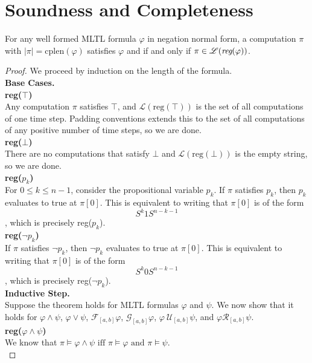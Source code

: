 \documentclass[runningheads]{llncs}
\renewcommand{\phi}{\varphi}
\begin{document}
 \section{Soundness and Completeness} \label{Appendix-SoundComplete}
\renewcommand\thetheorem{2}
 \begin{theorem}
 For any well formed MLTL formula $\phi$ in negation normal form, a computation $\pi$ with $|\pi| = \text{cplen}(\phi)$ satisfies $\phi$ and  if and only if $\pi \in \mathscr{L}(\emph{reg}(\phi))$.
\end{theorem}
 \begin{proof}
 We proceed by induction on the length of the formula.\\
 \noindent \textbf{Base Cases.}\\
 \noindent\textbf{reg($\top$)}\\
 Any computation $\pi$ satisfies $\top$, and $\mathscr{L}(\text{reg}(\top))$ is the set of all computations of one time step. Padding conventions extends this to the set of all computations of any positive number of time steps, so we are done.\\
 \noindent\textbf{reg($\bot$)}\\
 There are no computations that satisfy $\bot$ and $\mathscr{L}(\text{reg}(\bot))$ is the empty string, so we are done.\\
 \noindent\textbf{reg($p_k$)}\\
 For $0\leq k \leq n-1$, consider the propositional variable $p_k$. If $\pi$ satisfies $p_k$, then $p_k$ evaluates to true at $\pi[0]$. This is equivalent to writing that $\pi[0]$ is of the form 
 $$S^{k} 1 S^{n-k-1}$$,
 which is precisely reg($p_k$).\\
 \noindent\textbf{reg($\neg p_k$)}\\
 If $\pi$ satisfies $\neg p_k$, then $\neg p_k$ evaluates to true at $\pi[0]$. This is equivalent to writing that $\pi[0]$ is of the form 
 $$S^{k} 0 S^{n-k-1}$$,
 which is precisely reg($\neg p_k$).\\
 \noindent\textbf{Inductive Step.}\\
 Suppose the theorem holds for MLTL formulas $\varphi$ and $\psi$. We now show that it holds for $\varphi \land \psi$, $\varphi \lor \psi$, $\mathcal{F}_{[a,b]} \varphi$, $\mathcal{G}_{[a,b]} \varphi$, $\varphi \ \mathcal{U}_{[a,b]} \psi$, and $\varphi \mathcal{R}_{[a,b]} \psi$.\\
 \noindent \textbf{reg($\varphi \land \psi$)}\\
 We know that $\pi \vDash \varphi \land \psi \text{ iff } \pi \vDash \varphi \text{ and } \pi \vDash \psi$.\\

\end{proof}
\end{document}
